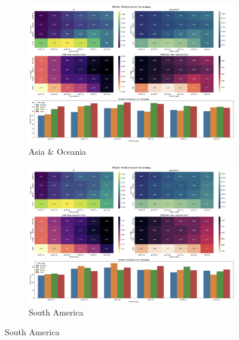 \documentclass[11pt,english,a4paper,hidelinks]{book}
\begin{document}
\begin{figure}[H]
    \begin{subfigure}[b]{0.48\textwidth}
        \centering
        \includegraphics[width=\textwidth]{images/code/models/linear_regression/third_model/AS - performance.png}
        \caption{Asia \& Oceania}
    \end{subfigure}
    \hfill
    \begin{subfigure}[b]{0.48\textwidth}
        \centering
        \includegraphics[width=\textwidth]{images/code/models/linear_regression/third_model/LAT - performance.png}
        \caption{South America}
    \end{subfigure}
    \hfill
    
    \vspace{0.5cm}
    

\end{figure}
\end{document}
